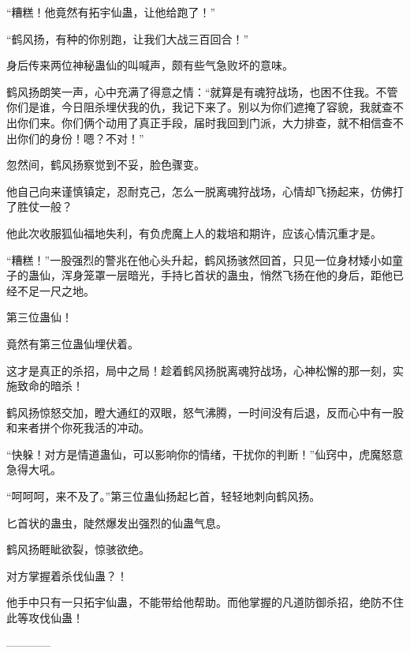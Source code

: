 \begin{this_body}
“糟糕！他竟然有拓宇仙蛊，让他给跑了！”

“鹤风扬，有种的你别跑，让我们大战三百回合！”

身后传来两位神秘蛊仙的叫喊声，颇有些气急败坏的意味。

鹤风扬朗笑一声，心中充满了得意之情：“就算是有魂狩战场，也困不住我。不管你们是谁，今日阻杀埋伏我的仇，我记下来了。别以为你们遮掩了容貌，我就查不出你们来。你们俩个动用了真正手段，届时我回到门派，大力排查，就不相信查不出你们的身份！嗯？不对！”

忽然间，鹤风扬察觉到不妥，脸色骤变。

他自己向来谨慎镇定，忍耐克己，怎么一脱离魂狩战场，心情却飞扬起来，仿佛打了胜仗一般？

他此次收服狐仙福地失利，有负虎魔上人的栽培和期许，应该心情沉重才是。

“糟糕！”一股强烈的警兆在他心头升起，鹤风扬骇然回首，只见一位身材矮小如童子的蛊仙，浑身笼罩一层暗光，手持匕首状的蛊虫，悄然飞扬在他的身后，距他已经不足一尺之地。

第三位蛊仙！

竟然有第三位蛊仙埋伏着。

这才是真正的杀招，局中之局！趁着鹤风扬脱离魂狩战场，心神松懈的那一刻，实施致命的暗杀！

鹤风扬惊怒交加，瞪大通红的双眼，怒气沸腾，一时间没有后退，反而心中有一股和来者拼个你死我活的冲动。

“快躲！对方是情道蛊仙，可以影响你的情绪，干扰你的判断！”仙窍中，虎魔怒意急得大吼。

“呵呵呵，来不及了。”第三位蛊仙扬起匕首，轻轻地刺向鹤风扬。

匕首状的蛊虫，陡然爆发出强烈的仙蛊气息。

鹤风扬睚眦欲裂，惊骇欲绝。

对方掌握着杀伐仙蛊？！

他手中只有一只拓宇仙蛊，不能带给他帮助。而他掌握的凡道防御杀招，绝防不住此等攻伐仙蛊！

------------

\end{this_body}

